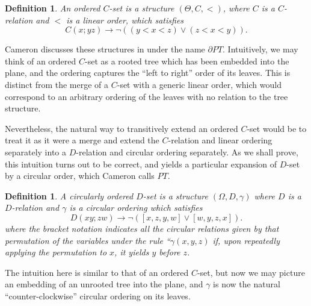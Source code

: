 \documentclass{amsart}
\newtheorem{definition}[theorem]{Definition}
\begin{document}
\begin{definition}
    An ordered $C$-set is a structure $(\Theta, C, <)$, where $C$ is a $C$-relation and $<$ is a linear order, which satisfies 
    $$C(x; yz ) \rightarrow \lnot ((y<x<z) \vee ( z < x < y)).$$
\end{definition}

Cameron discusses these structures in \cite[\S 4, 5]{cameron1987some} under the name $\partial PT$. Intuitively, we may think of an ordered $C$-set as a rooted tree which has been embedded into the plane, and the ordering captures the ``left to right'' order of its leaves. This is distinct from the merge of a $C$-set with a generic linear order, which would correspond to an arbitrary ordering of the leaves with no relation to the tree structure. 

Nevertheless, the natural way to transitively extend an ordered $C$-set would be to treat it as it were a merge and extend the $C$-relation and linear ordering separately into a $D$-relation and circular ordering separately. As we shall prove, this intuition turns out to be correct, and yields a particular expansion of $D$-set by a circular order, which Cameron calls $PT$.

\begin{definition}
    A circularly ordered $D$-set is a structure $(\Omega, D, \gamma)$ where $D$ is a $D$-relation and $\gamma$ is a circular ordering which satisfies
    $$D(xy;zw) \rightarrow \lnot ([x,z,y,w] \vee [w,y,z,x]).$$
    where the bracket notation indicates all the circular relations given by that permutation of the variables under the rule ``$\gamma(x,y,z)$ if, upon repeatedly applying the permutation to $x$, it yields $y$ before $z$.
\end{definition}

The intuition here is similar to that of an ordered $C$-set, but now we may picture an embedding of an unrooted tree into the plane, and $\gamma$ is now the natural ``counter-clockwise'' circular ordering on its leaves.
\end{document}
